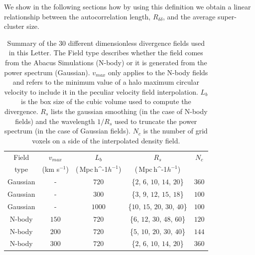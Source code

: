 \documentclass[usenatbib]{mnras}
\newcommand{\Mpch}{\,{\rm Mpc}\,\ifmmode h^{-1}\else $h^{-1}$\fi}
\begin{document}
We show in the following sections how by using this definition we obtain a linear relationship between the autocorrelation length, $R_{\delta\delta}$, and the average super-cluster size.


\begin{table}
\begin{tabular}{c c c c c}\hline
Field &  $v_{max}$ & $L_b$ & $R_s$ & $N_c$\\
type & (km s$^{-1}$) & (\Mpch) & (\Mpch) & \\\hline
Gaussian & - & $720$ & \{$2$, $6$, $10$, $14$, $20$\} & $360$\\
Gaussian & - & $300$ & \{$3$, $9$, $12$, $15$, $18$\} & $100$\\
Gaussian & - & $1000$ & \{$10$, $15$, $20$, $30$, $40$\} & $100$\\
N-body & $150$ & $720$ & \{$6$, $12$, $30$, $48$, $60$\} & $120$\\
N-body & $200$ & $720$ & \{$5$, $10$, $20$, $30$, $40$\} & $144$\\
N-body & $300$ & $720$ & \{$2$, $6$, $10$, $14$, $20$\} & $360$\\\hline
\end{tabular}
\caption{Summary of the $30$ different dimensionless divergence fields used in this Letter. 
The Field type describes whether the field comes from the Abacus Simulations (N-body) or it is generated from the power spectrum (Gaussian). $v_{max}$ only applies to the N-body fields and refers to the minimum value of a halo maximum circular velocity to include it in the peculiar velocity field interpolation.
$L_b$ is the box size of the cubic volume used to compute the divergence. $R_{s}$ lists the gaussian smoothing (in the case of N-body fields) and the wavelength $1/R_s$ used to truncate the power spectrum (in the case of Gaussian fields). $N_c$ is the number of grid voxels on a side of the interpolated density field.}
\label{table:values}
\end{table}
\end{document}
